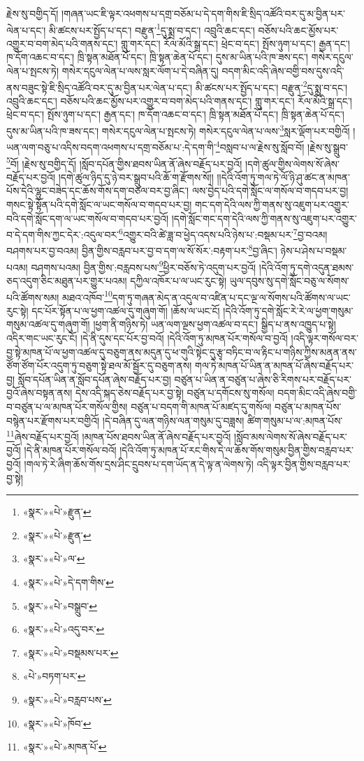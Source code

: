 རྗེས་སུ་བགྱིད་དོ། །གཞན་ཡང་ཇི་ལྟར་འཕགས་པ་དགྲ་བཅོམ་པ་དེ་དག་གིས་ཇི་སྲིད་འཚོའི་བར་དུ་མ་བྱིན་པར་ལེན་པ་དང་། མི་ཚངས་པར་སྤྱོད་པ་དང་། བརྫུན་\footnote{«སྣར་»«པེ་»རྫུན་}དུ་སྨྲ་བ་དང་། འབྲུའི་ཆང་དང་། བཅོས་པའི་ཆང་མྱོས་པར་འགྱུར་བ་བག་མེད་པའི་གནས་དང་། གླུ་གར་དང་། རོལ་མོའི་སྒྲ་དང་། ཕྲེང་བ་དང་། སྤོས་ཉུག་པ་དང་། རྒྱན་དང་། ཁ་དོག་འཆང་བ་དང་། ཁྲི་སྟན་མཐོན་པོ་དང་། ཁྲི་སྟན་ཆེན་པོ་དང་། དུས་མ་ཡིན་པའི་ཁ་ཟས་དང་། གསེར་དངུལ་ལེན་པ་སྤངས་ཏེ། གསེར་དངུལ་ལེན་པ་ལས་སླར་ལོག་པ་དེ་བཞིན་དུ། བདག་མིང་འདི་ཞེས་བགྱི་བས་དུས་འདི་ནས་བཟུང་སྟེ་ཇི་སྲིད་འཚོའི་བར་དུ་མ་བྱིན་པར་ལེན་པ་དང་། མི་ཚངས་པར་སྤྱོད་པ་དང་། བརྫུན་\footnote{«སྣར་»«པེ་»རྫུན་}དུ་སྨྲ་བ་དང་། འབྲུའི་ཆང་དང་། བཅོས་པའི་ཆང་མྱོས་པར་འགྱུར་བ་བག་མེད་པའི་གནས་དང་། གླུ་གར་དང་། རོལ་མོའི་སྒྲ་དང་། ཕྲེང་བ་དང་། སྤོས་ཉུག་པ་དང་། རྒྱན་དང་། ཁ་དོག་འཆང་བ་དང་། ཁྲི་སྟན་མཐོན་པོ་དང་། ཁྲི་སྟན་ཆེན་པོ་དང་། དུས་མ་ཡིན་པའི་ཁ་ཟས་དང་། གསེར་དངུལ་ལེན་པ་སྤངས་ཏེ། གསེར་དངུལ་ལེན་པ་ལས་\footnote{«སྣར་»«པེ་»ལ་}སླར་ལྡོག་པར་བགྱིའོ། །ཡན་ལག་བཅུ་པ་འདིས་བདག་འཕགས་པ་དགྲ་བཅོམ་པ་:དེ་དག་གི་\footnote{«སྣར་»«པེ་»དེ་དག་གིས་}བསླབ་པ་ལ་རྗེས་སུ་སློབ་བོ། །རྗེས་སུ་སྒྲུབ་\footnote{«སྣར་»«པེ་»བསྒྲུབ་}བོ། །རྗེས་སུ་བགྱིད་དོ། །སློབ་དཔོན་གྱིས་ཐབས་ཡིན་ནོ་ཞེས་བརྗོད་པར་བྱའོ། །དགེ་ཚུལ་གྱིས་ལེགས་སོ་ཞེས་བརྗོད་པར་བྱའོ། །དགེ་ཚུལ་ཉིད་དུ་ཉེ་བར་སྒྲུབ་པའི་ཆོ་ག་རྫོགས་སོ།། །།དེའི་འོག་ཏུ་གལ་ཏེ་ལོ་ཉི་ཤུ་ཚང་ན་མཁན་པོས་དེའི་ལྷུང་བཟེད་དང་ཆོས་གོས་དག་བཙལ་བར་བྱ་ཞིང་། ལས་བྱེད་པའི་དགེ་སློང་ལ་གསོལ་བ་གདབ་པར་བྱ། གསང་སྟེ་སྟོན་པའི་དགེ་སློང་ལ་ཡང་གསོལ་བ་གདབ་པར་བྱ། གང་དག་དེའི་ལས་ཀྱི་གནས་སུ་འཇུག་པར་འགྱུར་བའི་དགེ་སློང་དག་ལ་ཡང་གསོལ་བ་གདབ་པར་བྱའོ། །དགེ་སློང་གང་དག་དེའི་ལས་ཀྱི་གནས་སུ་འཇུག་པར་འགྱུར་བ་དེ་དག་གིས་ཀྱང་དེར་:འདུལ་བར་\footnote{«སྣར་»«པེ་»འདུ་བར་}འགྱུར་བའི་ཚེ་ཟླ་བ་ཕྱེད་འདས་པའི་ཉེས་པ་:བསྡམ་པར་\footnote{«སྣར་»«པེ་»བསྡམས་པར་}བྱ་བའམ། བཤགས་པར་བྱ་བའམ། བྱིན་གྱིས་བརླབ་པར་བྱ་བ་དག་ལ་སོ་སོར་:བརྟག་པར་\footnote{«པེ་»བཏག་པར་}བྱ་ཞིང་། ཉེས་པ་ཤེས་པ་བསྡམ་པའམ། བཤགས་པའམ། བྱིན་གྱིས་:བརླབས་པས་\footnote{«སྣར་»«པེ་»བརླབ་པས་}ཕྱིར་བཅོས་ཏེ་འདུག་པར་བྱའོ། །དེའི་འོག་ཏུ་དགེ་འདུན་ཐམས་ཅད་འདུག་ཅིང་མཐུན་པར་གྱུར་པའམ། དཀྱིལ་འཁོར་པ་ལ་ཡང་རུང་སྟེ། ཡུལ་དབུས་སུ་དགེ་སློང་བཅུ་ལ་སོགས་པའི་ཚོགས་སམ། མཐའ་འཁོབ་\footnote{«སྣར་»«པེ་»ཁོབ་}དག་ཏུ་གཞན་མེད་ན་འདུལ་བ་འཛིན་པ་དང་ལྔ་ལ་སོགས་པའི་ཚོགས་ལ་ཡང་རུང་སྟེ། དང་པོར་སྟོན་པ་ལ་ཕྱག་འཚལ་དུ་གཞུག་གོ། །ཆོས་ལ་ཡང་ངོ། །དེའི་འོག་ཏུ་དགེ་སློང་རེ་རེ་ལ་ཕྱག་གསུམ་གསུམ་འཚལ་དུ་གཞུག་གོ། །ཕྱག་ནི་གཉིས་ཏེ། ཡན་ལག་ལྔས་ཕྱག་འཚལ་བ་དང་། སྒྱིད་པ་ནས་འཁྱུད་པ་སྟེ། འདིར་གང་ཡང་རུང་ངོ། །དེ་ནི་དུས་དང་པོར་བྱ་བའོ། །དེའི་འོག་ཏུ་མཁན་པོར་གསོལ་བ་བྱའོ། །འདི་ལྟར་གསོལ་བར་བྱ་སྟེ་མཁན་པོ་ལ་ཕྱག་འཚལ་དུ་བཅུག་ནས་མདུན་དུ་ཕ་གུའི་སྟེང་དུ་རྩྭ་བཏིང་བ་ལ་རྟིང་པ་གཉིས་ཀྱིས་མནན་ནས་ཙོག་ཙོག་པོར་འདུག་ཏུ་བཅུག་སྟེ་ཐལ་མོ་སྦྱོར་དུ་བཅུག་ནས། གལ་ཏེ་མཁན་པོ་ཡིན་ན་མཁན་པོ་ཞེས་བརྗོད་པར་བྱ། སློབ་དཔོན་ཡིན་ན་སློབ་དཔོན་ཞེས་བརྗོད་པར་བྱ། བཙུན་པ་ཡིན་ན་བཙུན་པ་ཞེས་ཅི་རིགས་པར་བརྗོད་པར་བྱའོ་ཞེས་བསྟན་ནས། དེས་འདི་སྐད་ཅེས་བརྗོད་པར་བྱ་སྟེ། བཙུན་པ་དགོངས་སུ་གསོལ། བདག་མིང་འདི་ཞེས་བགྱི་བ་བཙུན་པ་ལ་མཁན་པོར་གསོལ་གྱིས། བཙུན་པ་བདག་གི་མཁན་པོ་མཛད་དུ་གསོལ། བཙུན་པ་མཁན་པོས་བསྙེན་པར་རྫོགས་པར་བགྱིའོ། །དེ་བཞིན་དུ་ལན་གཉིས་ལན་གསུམ་དུ་བཟླས། ཚིག་གསུམ་པ་ལ་:མཁན་པོས་\footnote{«སྣར་»«པེ་»མཁན་པོ་}ཞེས་བརྗོད་པར་བྱའོ། །མཁན་པོས་ཐབས་ཡིན་ནོ་ཞེས་བརྗོད་པར་བྱའོ། །སློབ་མས་ལེགས་སོ་ཞེས་བརྗོད་པར་བྱའོ། །དེ་ནི་མཁན་པོར་གསོལ་བའོ། །དེའི་འོག་ཏུ་མཁན་པོ་རང་གིས་དེ་ལ་ཆོས་གོས་གསུམ་བྱིན་གྱིས་བརླབ་པར་བྱའོ། །གལ་ཏེ་རེ་ཞིག་ཆོས་གོས་དྲས་ཤིང་དྲུབས་པ་དག་ཡོད་ན་དེ་ལྟ་ན་ལེགས་ཏེ། འདི་ལྟར་བྱིན་གྱིས་བརླབ་པར་བྱ་སྟེ། 